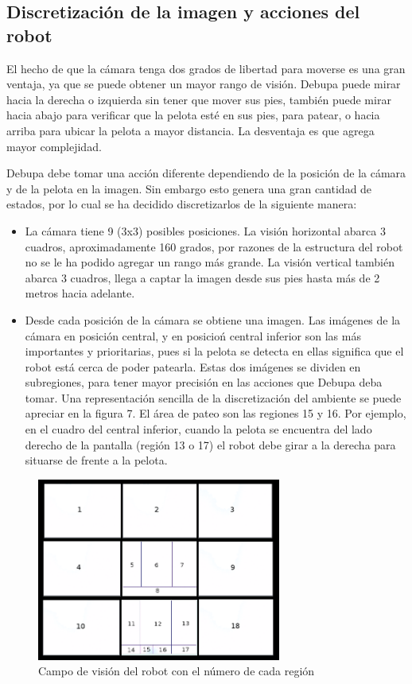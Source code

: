 \documentclass[conference, letterpaper]{IEEEtranMC1}
\begin{document}
\subsection{Discretización de la imagen y acciones del robot}

El hecho de  que la cámara tenga dos grados de libertad para moverse es una gran ventaja, ya que se puede obtener un mayor rango de visión. Debupa puede mirar hacia la derecha o izquierda sin tener que mover sus pies, también puede mirar hacia abajo para verificar que la pelota esté en sus pies, para patear, o hacia arriba para ubicar la pelota a mayor distancia. La desventaja es que agrega mayor complejidad.

Debupa debe tomar una acción diferente dependiendo de la posición de la cámara y de la pelota en la imagen. Sin embargo esto genera una gran cantidad de estados, por lo cual se ha decidido discretizarlos de la siguiente manera:  
\begin{itemize}
\item La cámara tiene 9  (3x3) posibles posiciones.  La visión horizontal abarca 3 cuadros, aproximadamente 160 grados, por razones de la estructura del robot no se le ha podido agregar un rango más grande. La visión vertical también abarca 3 cuadros, llega a captar la imagen desde sus pies hasta más de 2 metros hacia adelante.
\item Desde cada posición de la cámara se obtiene una imagen. Las im\'agenes de la c\'amara en posici\'on central, y en posicio\'n central inferior  son las m\'as importantes  y prioritarias, pues si la pelota se  detecta en ellas significa que el robot est\'a cerca de poder patearla. Estas dos  im\'agenes se dividen en subregiones, para tener mayor precisi\'on en las  acciones  que Debupa deba tomar. 
Una representación sencilla de la discretización del ambiente se puede apreciar en la figura 7. El \'area de pateo son las regiones 15 y 16.  Por ejemplo, en el cuadro del central inferior,  cuando la pelota se encuentra del lado derecho de la pantalla (región 13 o 17) el robot debe girar a la derecha para situarse de frente a la pelota. \end{itemize}

\begin{figure}
 \includegraphics[height=6cm]{discretizacion.png}
 \caption{Campo de visión del robot con el número de cada región}
 	\label{fig:figura4}
 \end{figure} 
\end{document}
